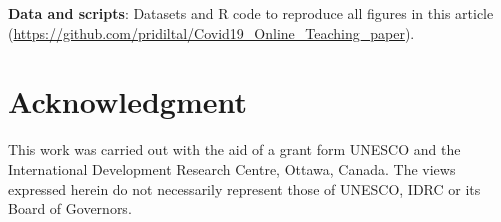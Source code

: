 \documentclass[11pt,a4paper,]{article}
\begin{document}
\textbf{Data and scripts}: Datasets and R code to reproduce all figures in this article (\url{https://github.com/pridiltal/Covid19_Online_Teaching_paper}).

\hypertarget{acknowledgment}{%
\section*{Acknowledgment}\label{acknowledgment}}

This work was carried out with the aid of a grant form UNESCO and the International Development Research Centre, Ottawa, Canada. The views expressed herein do not necessarily represent those of UNESCO, IDRC or its Board of Governors.

\printbibliography
\end{document}
